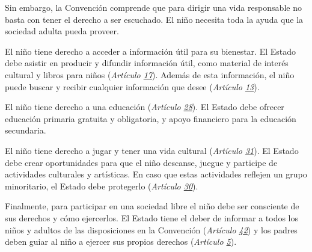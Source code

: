 \documentclass{tufte-handout}
\begin{document}
Sin embargo, la Convención comprende que para dirigir una vida responsable no basta con tener el derecho a ser escuchado. El niño necesita toda la ayuda que la sociedad adulta pueda proveer.

El niño tiene derecho a acceder a información útil para su bienestar. El Estado debe asistir en producir y difundir información útil, como material de interés cultural y libros para niños (\textit{Artículo \href{https://procosi.github.io/nenes/convencion/?a=17}{17}}). Además de esta información, el niño puede buscar y recibir cualquier información que desee (\textit{Artículo \href{https://procosi.github.io/nenes/convencion/?a=13}{13}}).

El niño tiene derecho a una educación (\textit{Artículo \href{https://procosi.github.io/nenes/convencion/?a=28}{28}}). El Estado debe ofrecer educación primaria gratuita y obligatoria, y apoyo financiero para la educación secundaria. 

El niño tiene derecho a jugar y tener una vida cultural (\textit{Artículo \href{https://procosi.github.io/nenes/convencion/?a=31}{31}}). El Estado debe crear oportunidades para que el niño descanse, juegue y participe de actividades culturales y artísticas. En caso que estas actividades reflejen un grupo minoritario, el Estado debe protegerlo (\textit{Artículo \href{https://procosi.github.io/nenes/convencion/?a=30}{30}}).

Finalmente, para participar en una sociedad libre el niño debe ser consciente de sus derechos y cómo ejercerlos. El Estado tiene el deber de informar a todos los niños y adultos de las disposiciones en la Convención (\textit{Artículo \href{https://procosi.github.io/nenes/convencion/?a=42}{42}}) y los padres deben guiar al niño a ejercer sus propios derechos (\textit{Artículo \href{https://procosi.github.io/nenes/convencion/?a=5}{5}}).
\end{document}
